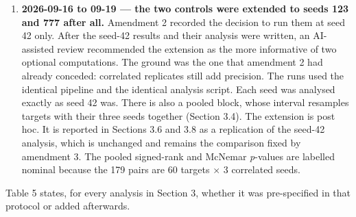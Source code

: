 \documentclass[11pt,a4paper]{article}
\begin{document}
\begin{enumerate}
  with the minimum detectable effect. Those four elements are what the dated amendment
  fixed: pairing, the continuous primary, the binary secondary, and MDE reporting. The
  amendment did not specify how incomplete pairs are handled, nor a multiplicity
  correction across the two controls. The analysis script drops a pair whose solver call
  failed on either side. The two control comparisons are reported at their nominal \emph{p},
  with Holm corrections over the two primaries and over all ten control tests as
  sensitivity analyses (Section 2.5). Both choices were made when the script was written
  and are stated here rather than claimed as pre-specified. What was already known was
  the main arm\textquotesingle s rates. What did not yet exist was any control run; the archived analysis
  file of that date records all six control conditions as absent. This is therefore an
  amendment informed by the main-arm results and fixed before the control results. It is
  not a pre-data plan, and not a choice made after seeing the comparison it governs.
\item
  \textbf{2026-09-16 to 09-19 --- the two controls were extended to seeds 123 and 777 after
  all.} Amendment 2 recorded the decision to run them at seed 42 only. After the seed-42
  results and their analysis were written, an AI-assisted review recommended the
  extension as the more informative of two optional computations. The ground was the one
  that amendment 2 had already conceded: correlated replicates still add precision. The
  runs used the identical pipeline and the identical analysis script. Each seed was
  analysed exactly as seed 42 was. There is also a pooled block, whose interval resamples
  targets with their three seeds together (Section 3.4). The extension is post hoc. It is
  reported in Sections 3.6 and 3.8 as a replication of the seed-42 analysis, which is
  unchanged and remains the comparison fixed by amendment 3. The pooled signed-rank and
  McNemar \emph{p}-values are labelled nominal because the 179 pairs are 60 targets \ensuremath{\times} 3
  correlated seeds.
\end{enumerate}

Table 5 states, for every analysis in Section 3, whether it was pre-specified in that
protocol or added afterwards.
\end{document}
